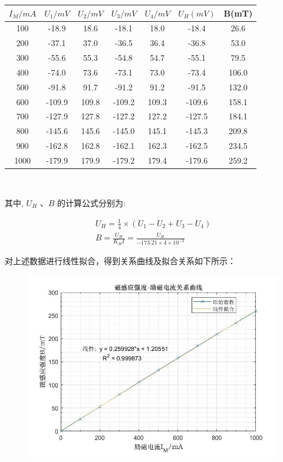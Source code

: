\documentclass[UTF8]{ctexart}
\begin{document}
\begin{center}
\begin{tabular}{c|c|c|c|c|c|c}
  \hline $I_M/mA$ & $U_1/mV$ & $U_2/mV$ & $U_3/mV $ & $U_4/mV$ &$U_H(mV)$ & B(mT) \\
  \hline 100   & -18.9  & 18.6  & -18.1  & 18.0  & -18.4  & 26.6  \\
  \hline  200   & -37.1  & 37.0  & -36.5  & 36.4  & -36.8  & 53.0  \\
  \hline  300   & -55.6  & 55.3  & -54.8  & 54.7  & -55.1  & 79.5  \\
  \hline  400   & -74.0  & 73.6  & -73.1  & 73.0  & -73.4  & 106.0  \\
  \hline  500 & -91.8  & 91.7  & -91.2  & 91.2  & -91.5  & 132.0  \\
  \hline  600 & -109.9 & 109.8 & -109.2  & 109.3 & -109.6 & 158.1 \\
  \hline  700 & -127.9 & 127.8 & -127.2  & 127.2 & -127.5 & 184.1 \\
  \hline  800 & -145.6 & 145.6 & -145.0  & 145.1 & -145.3 & 209.8  \\
  \hline  900 & -162.8 & 162.8  & -162.1  & 162.3 & -162.5 & 234.5 \\
  \hline 1000& -179.9 & 179.9  & -179.2  & 179.4 & -179.6 & 259.2  \\
  \hline
\end{tabular}\\
\end{center}

其中, $ U_{H}$ 、$ B $ 的计算公式分别为:

$$
\begin{array}{c}
U_{H}=\frac{1}{4} \times\left(U_{1}-U_{2}+U_{3}-U_{4}\right) \\
B=\frac{U_{H}}{K_{H} I}=\frac{U_{H}}{-173.21 \times 4 \times 10^{-3}}
\end{array}
$$

对上述数据进行线性拟合，得到关系曲线及拟合关系如下所示：
\begin{figure}[H]
  \centering
  \includegraphics[scale=0.6]{拟合2.jpg}
\end{figure}
\end{document}
